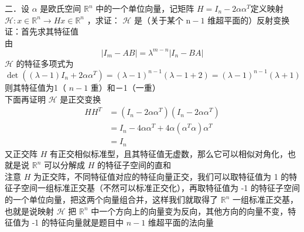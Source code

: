\documentclass[UTF8]{ctexart}
\begin{document}
\noindent 二．设 $\alpha$ 是欧氏空间 $\mathbb{R}^{n}$ 中的一个单位向量，记矩阵 $H=I_{n}-2 \alpha \alpha^{T}$定义映射 $\mathcal{H}: x \in \mathbb{R}^{n} \rightarrow H x \in \mathbb{R}^{n}$ ，求证： $\mathcal{H}$ 是（关于某个 $\mathrm{n}-1$ 维超平面的）反射变换\\
证：首先求其特征值\\
由 
$$\left|I_{m}-A B\right|=\lambda^{m-n}\left|I_{n}-B A\right|$$
$\mathcal{H}$ 的特征多项式为 $$\operatorname{det}\left((\lambda-1) I_{n}+2 \alpha \alpha^{T}\right)=(\lambda-1)^{n-1}(\lambda-1+2)=(\lambda-1)^{n-1}(\lambda+1)$$
则其特征值为1（ $n-1$ 重）和－1（一重）\\
下面再证明 $\mathcal{H}$ 是正交变换
$$
\begin{aligned}
	H H^{T} & =\left(I_{n}-2 \alpha \alpha^{T}\right)\left(I_{n}-2 \alpha \alpha^{T}\right) \\
	& =I_{n}-4 \alpha \alpha^{T}+4 \alpha\left(\alpha^{T} \alpha\right) \alpha^{T} \\
	& =I_{n}
\end{aligned}
$$
又正交阵 $H$ 有正交相似标准型，且其特征值无虚数，那么它可以相似对角化，也就是说 $\mathbb{R}^{n}$ 可以分解成 $H$ 的特征子空间的直和\\
注意 $H$ 为正交阵，不同特征值对应的特征向量正交，我们可以取特征值为 1 的特征子空间一组标准正交基（不然可以标准正交化），再取特征值为 -1 的特征子空间的一个单位向量，把这两个向量组合并，这样我们就取得了 $\mathbb{R}^{n}$ 一组标准正交基，也就是说映射 $\mathcal{H}$ 把 $\mathbb{R}^{n}$ 中一个方向上的向量变为反向，其他方向的向量不变，特征值为 -1 的特征向量就是题目中 $n-1$ 维超平面的法向量\\
\end{document}
